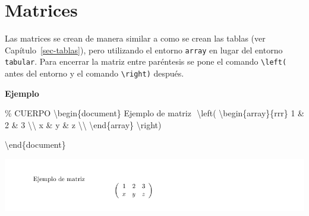 \documentclass[
  letterpaper,
  DIV=11,
  numbers=noendperiod]{scrreport}
\newenvironment{Shaded}{\begin{snugshade}}{\end{snugshade}}
\newcommand{\CommentTok}[1]{\textcolor[rgb]{0.37,0.37,0.37}{#1}}
\newcommand{\ExtensionTok}[1]{\textcolor[rgb]{0.00,0.23,0.31}{#1}}
\newcommand{\KeywordTok}[1]{\textcolor[rgb]{0.00,0.23,0.31}{#1}}
\newcommand{\NormalTok}[1]{\textcolor[rgb]{0.00,0.23,0.31}{#1}}
\newcommand{\SpecialCharTok}[1]{\textcolor[rgb]{0.37,0.37,0.37}{#1}}
\newcommand{\SpecialStringTok}[1]{\textcolor[rgb]{0.13,0.47,0.30}{#1}}
\begin{document}
\hypertarget{matrices}{%
\section{Matrices}\label{matrices}}

Las matrices se crean de manera similar a como se crean las tablas (ver
Capítulo~\ref{sec-tablas}), pero utilizando el entorno \texttt{array} en
lugar del entorno \texttt{tabular}. Para encerrar la matriz entre
paréntesis se pone el comando \texttt{\textbackslash{}left(} antes del
entorno y el comando \texttt{\textbackslash{}right)} después.

\textbf{Ejemplo}

\begin{Shaded}
\begin{Highlighting}[]
\CommentTok{\% CUERPO}
\KeywordTok{\textbackslash{}begin}\NormalTok{\{}\ExtensionTok{document}\NormalTok{\}}
\NormalTok{Ejemplo de matriz}
\SpecialStringTok{$$}
\SpecialCharTok{\textbackslash{}left}\SpecialStringTok{(}
\KeywordTok{\textbackslash{}begin}\NormalTok{\{}\ExtensionTok{array}\NormalTok{\}}\SpecialStringTok{\{rrr\}}
\SpecialStringTok{1 \& 2 \& 3 }\SpecialCharTok{\textbackslash{}\textbackslash{}}
\SpecialStringTok{x \& y \& z }\SpecialCharTok{\textbackslash{}\textbackslash{}}
\KeywordTok{\textbackslash{}end}\NormalTok{\{}\ExtensionTok{array}\NormalTok{\}}
\SpecialCharTok{\textbackslash{}right}\SpecialStringTok{)}
\SpecialStringTok{$$}



\KeywordTok{\textbackslash{}end}\NormalTok{\{}\ExtensionTok{document}\NormalTok{\}}
\end{Highlighting}
\end{Shaded}

\begin{tcolorbox}[enhanced jigsaw, arc=.35mm, toprule=.15mm, opacitybacktitle=0.6, colback=white, coltitle=black, colbacktitle=quarto-callout-note-color!10!white, breakable, colframe=quarto-callout-note-color-frame, left=2mm, opacityback=0, bottomtitle=1mm, toptitle=1mm, titlerule=0mm, title={Salida}, bottomrule=.15mm, leftrule=.75mm, rightrule=.15mm]
\includegraphics{./img/formulas/matriz.png}
\end{tcolorbox}
\end{document}
